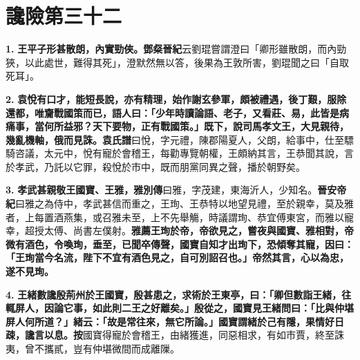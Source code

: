 \chapter{讒險第三十二}

\textbf{1.} \textbf{王平子形甚散朗，內實勁俠。}{\footnotesize \textbf{鄧粲晉紀}云劉琨嘗謂澄曰「卿形雖散朗，而內勁狹，以此處世，難得其死」，澄默然無以答，後果為王敦所害，劉琨聞之曰「自取死耳」。}

\textbf{2.} \textbf{袁悅有口才，能短長說，亦有精理，始作謝玄參軍，頗被禮遇，後丁艱，服除還都，唯齎戰國策而已，語人曰：「少年時讀論語、老子，又看莊、易，此皆是病痛事，當何所益邪？天下要物，正有戰國策。」既下，說司馬孝文王，大見親待，幾亂機軸，俄而見誅。}{\footnotesize \textbf{袁氏譜}曰悅，字元禮，陳郡陽夏人，父朗，給事中，仕至驃騎咨議，太元中，悅有寵於會稽王，每勸專覽朝權，王頗納其言，王恭聞其說，言於孝武，乃託以它罪，殺悅於市中，既而朋黨同異之聲，播於朝野矣。}

\textbf{3.} \textbf{孝武甚親敬王國寶、王雅，}{\footnotesize \textbf{雅別傳}曰雅，字茂建，東海沂人，少知名。\textbf{晉安帝紀}曰雅之為侍中，孝武甚信而重之，王珣、王恭特以地望見禮，至於親幸，莫及雅者，上每置酒燕集，或召雅未至，上不先舉觴，時議謂珣、恭宜傅東宮，而雅以寵幸，超授太傅、尚書左僕射。}\textbf{雅薦王珣於帝，帝欲見之，嘗夜與國寶、雅相對，帝微有酒色，令喚珣，垂至，已聞卒傳聲，國寶自知才出珣下，恐傾奪其寵，因曰：「王珣當今名流，陛下不宜有酒色見之，自可別詔召也。」帝然其言，心以為忠，遂不見珣。}

\textbf{4.} \textbf{王緒數讒殷荊州於王國寶，殷甚患之，求術於王東亭，曰：「卿但數詣王緒，往輒屏人，因論它事，如此則二王之好離矣。」殷從之，國寶見王緒問曰：「比與仲堪屏人何所道？」緒云：「故是常往來，無它所論。」國寶謂緒於己有隱，果情好日疎，讒言以息。}{\footnotesize \textbf{按}國寶得寵於會稽王，由緒獲進，同惡相求，有如市賈，終至誅夷，曾不攜貳，豈有仲堪微間而成離隟。}